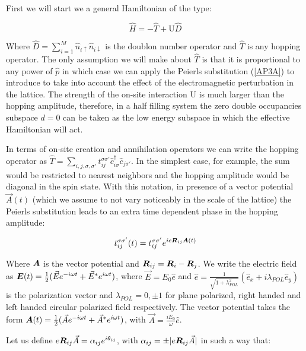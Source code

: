 First we will start we a general Hamiltonian of the type:

\begin{equation}
\hat{H} = -\hat{T} + \text{U}\hat{D}
\end{equation}

Where $\hat{D} = \sum_{i=1}^M \hat{n}_{i\uparrow}\hat{n}_{i\downarrow}$ is the doublon number operator and $\hat{T}$ is any hopping operator. The only assumption we will make about $\hat{T}$ is that it is proportional to any power of $\hat{p}$ in which case we can apply the Peierls substitution (\ref{AP3A}) to introduce to take into account the effect of the electromagnetic perturbation in the lattice. The strength of the on-site interaction $\text{U}$ is much larger than the hopping amplitude, therefore, in a half filling system the zero double occupancies subspace $d=0$ can be taken as the low energy subspace in which the effective Hamiltonian will act.

In terms of on-site creation and annihilation operators we can write the hopping operator as $\hat{T} = \sum_{i,j, \sigma, \sigma'} t_{ij}^{\sigma \sigma'} \hat{c}_{i \sigma}^\dagger \hat{c}_{j \sigma'}$. In the simplest case, for example, the sum would be restricted to nearest neighbors and the hopping amplitude would be diagonal in the spin state. With this notation, in presence of a vector potential $\vec{A}(t)$ (which we assume to not vary noticeably in the scale of the lattice) the Peierls substitution leads to an extra time dependent phase in the hopping amplitude:

\begin{equation}
t_{ij}^{\sigma \sigma'}(t) = t_{ij}^{\sigma \sigma'} e^{ie\boldsymbol{R}_{ij}\boldsymbol{A}(t)}
\end{equation}

Where $\boldsymbol{A}$ is the vector potential and $\boldsymbol{R}_{ij} = \boldsymbol{R}_i-\boldsymbol{R}_j$. We write the electric field as $\boldsymbol{E}(t) = \frac{1}{2}(\vec{E}e^{-i\omega t}+\vec{E}^*e^{i\omega t})$, where $\vec{E} = E_0\hat{e}$ and $\hat{e} = \frac{1}{\sqrt{1+\lambda_{POL}^2}}(\hat{e}_x+i\lambda_{POL}\hat{e}_y)$ is the polarization vector and $\lambda_{POL} = 0, \pm 1$ for plane polarized, right handed and left handed circular polarized field respectively. The vector potential takes the form $\boldsymbol{A}(t) = \frac{1}{2}(\vec{A}e^{-i\omega t} + \vec{A}^* e^{i\omega t})$, with $\vec{A} = \frac{iE_0}{\omega}\hat{e}$.

Let us define $e\boldsymbol{R}_{ij}\vec{A} = \alpha_{ij} e^{i \theta_{ij}}$, with $\alpha_{ij} = \pm|e\boldsymbol{R}_{ij}\vec{A}|$ in such a way that:

